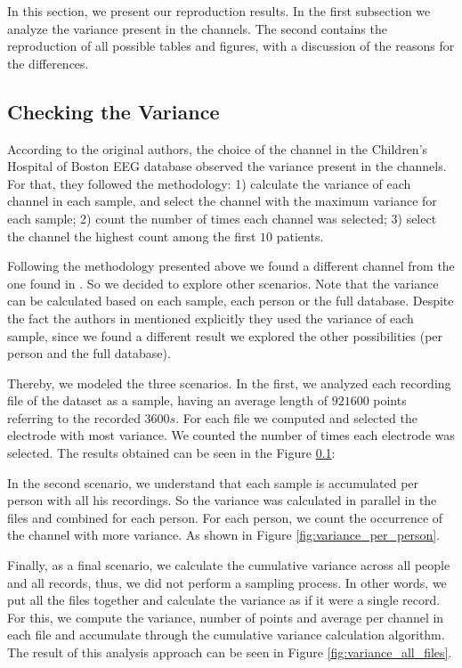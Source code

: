 In this section, we present our reproduction results. In the first subsection we analyze the variance present in the channels. The second contains the reproduction of all possible tables and figures, with a discussion of the reasons for the differences. 

\subsection{Checking the Variance} 

According to the original authors, the choice of the channel in the Children's Hospital of Boston EEG database observed the variance present in the channels. For that, they followed the methodology: 1) calculate the variance of each channel in each sample, and select the channel with the maximum variance for each sample; 2) count the number of times each channel was selected; 3) select the channel the highest count among the first $10$ patients.

Following the methodology presented above we found a different channel from the one found in \cite{WenZha:2018}. So we decided to explore other scenarios. Note that the variance can be calculated based on each sample, each person or the full database. Despite the fact the authors in \cite{WenZha:2018} mentioned explicitly they used the variance of each sample, since we found a different result we explored the other possibilities (per person and the full database).

Thereby, we modeled the three scenarios. In the first, we analyzed each recording file of the dataset as a sample, having an average length of $921600$ points referring to the recorded $3600s$. For each file we computed and selected the electrode with most variance. We counted the number of times each electrode was selected. The results obtained can be seen in the Figure \ref{}:

In the second scenario, we understand that each sample is accumulated per person with all his recordings. So the variance was calculated in parallel in the files and combined for each person. For each person, we count the occurrence of the channel with more variance. As shown in Figure \ref{fig:variance_per_person}.

Finally, as a final scenario, we calculate the cumulative variance across all people and all records, thus, we did not perform a sampling process. In other words, we put all the files together and calculate the variance as if it were a single record. For this, we compute the variance, number of points and average per channel in each file and accumulate through the cumulative variance calculation algorithm. The result of this analysis approach can be seen in Figure \ref{fig:variance_all_files}.



